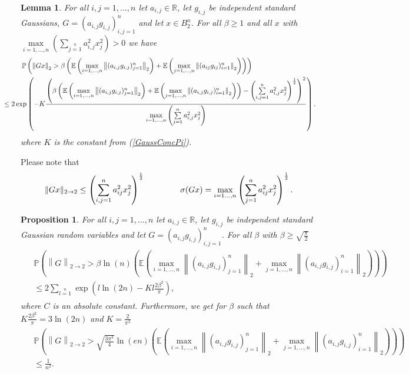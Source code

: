 \documentclass[12pt,a4paper]{article}
\newtheorem{lem}[satz]{Lemma}
\newtheorem{proposition}[satz]{Proposition}
\newcommand{\R}{\ensuremath{{\mathbb R}}}
\newcommand{\Pv}{\mathbb{P}}
\newcommand{\Ex}{\mathbb{E}}
\newcommand{\norm}[1]{\left \lVert#1 \right\rVert}
\begin{document}
\begin{lem}\label{lem:konzentration} For all $i,j=1,...,n$ let $a_{i,j}\in\R$, let $g_{i,j}$ be independent standard Gaussians, $G=(a_{i,j}g_{i,j})_{i,j=1}^n$ and let $x\in B_2^n$. For all $\beta\geq 1$ and all $x$ with
$\max\limits_{i=1,...,n}\left(\sum\limits_{j=1}\limits^na_{i,j}^2x_j^2\right)>0$ we have
\begin{eqnarray*}
	\left.\begin{split}
	& \Pv\left(\norm{Gx}_2>\beta
\left(\Ex\left(\max\limits_{i=1,...,n}\norm{(a_{i,j}g_{i,j})_{j=1}^n}_2\right)+\Ex\left(\max\limits_{j=1,...,n}\norm{(a_{ij}g_{ij})_{i=1}^n}_2\right)
\right)\right)\\
& \hskip -10mm\leq
2 \exp\left(-K\frac{\left(\beta
\left(\Ex\left(\max\limits_{i=1,...,n}\norm{(a_{i,j}g_{i,j})_{j=1}^n}_2\right)+\Ex\left(\max\limits_{j=1,...,n}\norm{(a_{i,j}g_{i,j})_{i=1}^n}_2\right)\right)-\left(\sum\limits_{i,j=1}\limits^na_{i,j}^2x_j^2\right)^{\frac{1}{2}}
\right)^2}{\max\limits_{i=1,...,n}\left(\sum\limits_{j=1}\limits^na_{i,j}^2x_j^2\right)}\right).
\end{split}\right.
\end{eqnarray*}
where $K$ is the constant from (\ref{GaussConcPi}).
\end{lem}
\vskip 3mm

Please note that
$$
\|Gx\|_{2\to2}\leq\left(\sum\limits_{i,j=1}\limits^na_{ij}^2x_j^2\right)^{\frac{1}{2}}
\hskip 15mm
\sigma(Gx)
=\max_{i=1\dots,n}\left(\sum\limits_{j=1}\limits^na_{ij}^2x_j^2\right)^{\frac{1}{2}}.
$$
\vskip 3mm

\begin{proposition}\label{lem:obere_ab} For all $i,j=1,...,n$ let $a_{i,j}\in\R$, 
let $g_{i,j}$ be independent standard Gaussian random variables and let 
$G=(a_{i,j}g_{i,j})_{i,j=1}^n$. For all $\beta$ with $\beta\geq\sqrt{\frac{\pi}{2}}$ \begin{eqnarray*}
\left.\begin{split}
& \Pv\left(\norm{G}_{2\rightarrow 2}>\beta \ln(n)
\left(\Ex\left(\max\limits_{i=1,...,n}\norm{(a_{i,j}g_{i,j})_{j=1}^n}_2
+\max\limits_{j=1,...,n}\norm{(a_{i,j}g_{i,j})_{i=1}^n}_2\right)\right)\right)\\
& \le2\sum\limits_{l=1}\limits^n
\exp\left(l\ln(2n)-Kl\frac{2\beta^{2}}{\pi }\right),
\end{split}\right.
\end{eqnarray*}
where $C$ is an absolute constant. Furthermore, we get for 
$\beta$ such that $K\frac{2\beta^{2}}{\pi }=3\ln(2n)$ and $K=\frac{2}{\pi^{2}}$
\begin{eqnarray*}
\left.\begin{split}
& \Pv\left(\norm{G}_{2\rightarrow 2}
>\sqrt{\frac{3\pi^{3}}{4}}\ln(en)
\left(\Ex\left(\max\limits_{i=1,...,n}\norm{(a_{i,j}g_{i,j})_{j=1}^n}_2+
\max\limits_{j=1,...,n}\norm{(a_{i,j}g_{i,j})_{i=1}^n}_2\right)\right)\right)\\
&
\leq\frac{1}{n^2}.
\end{split}\right.
\end{eqnarray*}
\end{proposition}
\end{document}
